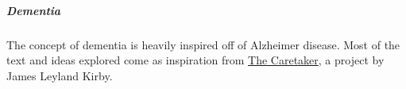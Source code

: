 \begin{linenumbers}
\subparagraph{Dementia} The concept of dementia is heavily inspired off of Alzheimer disease.
Most of the text and ideas explored come as inspiration from \href{https://thecaretaker.bandcamp.com/}{The Caretaker}, a project by James Leyland Kirby.






\end{linenumbers}
